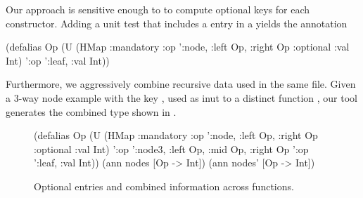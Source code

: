 Our approach is sensitive enough to
to compute optional keys for each constructor.
Adding a unit test that includes a 
entry in a  yields the annotation
\begin{cljlisting}
(defalias Op 
  (U (HMap :mandatory
           {:op ':node, :left Op, :right Op}
           :optional {:val Int})
     '{:op ':leaf, :val Int}))
\end{cljlisting}

Furthermore, we aggressively combine recursive data used
in the same file.
Given a 3-way node example with the key ,
used as inut to a distinct function ,
our tool generates the combined type shown in .

\begin{figure}
\begin{cljlisting}
(defalias Op 
  (U (HMap :mandatory
           {:op ':node, :left Op, :right Op}
           :optional {:val Int})
     '{:op ':node3, :left Op, :mid Op, :right Op}
     '{:op ':leaf, :val Int}))
(ann nodes [Op -> Int])
(ann nodes' [Op -> Int])
\end{cljlisting}
\caption{Optional entries and combined information across functions.}
\label{fig:infer:node3}
\end{figure}

%



